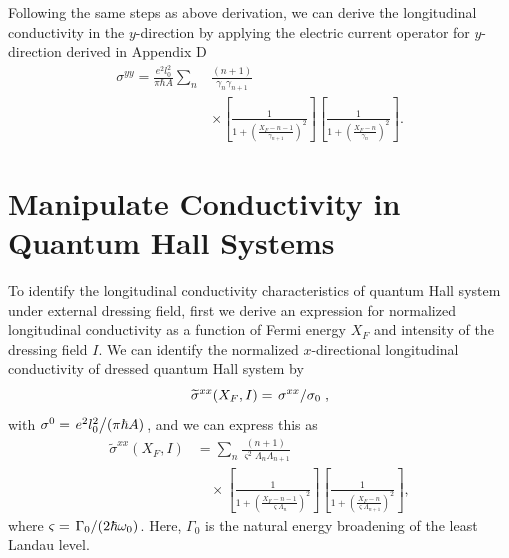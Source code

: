 \documentclass[
 reprint,
 amsmath,amssymb,
 aps,
 prb,
]{revtex4-2}
\begin{document}
{Following the same steps as above derivation, we can derive the longitudinal conductivity in the $y$-direction by applying the electric current operator for $y$-direction derived in Appendix D
\begin{equation} \label{eq:36}
  \begin{aligned}
    {\sigma}^{yy} =
    \frac{e^2l_0^2}{\pi\hbar A}
    \sum_{n} &
    \frac{(n+1)}{\gamma_{n}\gamma_{n+1}} \\
    &\times
    \left[
      \frac{1}
      {
        1 + \left(\frac{X_F - n -1}{\gamma_{n+1}}\right)^2
      }
    \right]
    \left[
      \frac{1}
      {
        1 + \left(\frac{X_F - n}{\gamma_{n}}\right)^2
      }
    \right].
  \end{aligned}
\end{equation}
}

\section{\label{sec:manipulate_conductivity} Manipulate Conductivity in Quantum Hall Systems}

To identify the longitudinal conductivity characteristics of quantum Hall system under external dressing field, first we derive an expression for normalized longitudinal conductivity as a function of Fermi energy $X_F$ and intensity of the dressing field $I$.
We can identify the normalized $x$-directional longitudinal conductivity of dressed quantum Hall system by
\begin{equation}\label{eq:37}
  \widetilde{\sigma}^{xx}(X_F,I) =
  \flatfrac{\sigma^{xx}}{\sigma_{0}},
\end{equation}
with {\color{Red}$\sigma^0 = \flatfrac{e^2l_0^2}{(\pi \hbar A)}$}, and we can express this as
\begin{equation} \label{eq:38}
  \begin{aligned}
    \widetilde{\sigma}^{xx}(X_F,I) &=
    \sum_{n}
    \frac{(n+1)}{\varsigma^2 \Lambda_n \Lambda_{n+1}} \\
    &\quad\times
    \left[
      \frac{1}
      {
        1 + \left(\frac{X_F - n -1}{\varsigma \Lambda_n}\right)^2
      }
    \right]
    \left[
      \frac{1}
      {
        1 + \left(\frac{X_F - n}{\varsigma \Lambda_{n+1}}\right)^2
      }
    \right],
  \end{aligned}
\end{equation}
where $\varsigma = \flatfrac{\Gamma_0}{(2\hbar \omega_0)}$. Here, $\Gamma_0$ is the natural energy broadening of the least Landau level.
\end{document}
